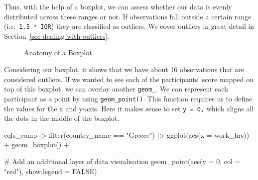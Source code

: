 \documentclass[
  letterpaper,
]{krantz}
\makeatletter
\newenvironment{Shaded}{\begin{snugshade}}{\end{snugshade}}
\newcommand{\AttributeTok}[1]{\textcolor[rgb]{0.40,0.45,0.13}{#1}}
\newcommand{\CommentTok}[1]{\textcolor[rgb]{0.37,0.37,0.37}{#1}}
\newcommand{\ConstantTok}[1]{\textcolor[rgb]{0.56,0.35,0.01}{#1}}
\newcommand{\DecValTok}[1]{\textcolor[rgb]{0.68,0.00,0.00}{#1}}
\newcommand{\FunctionTok}[1]{\textcolor[rgb]{0.28,0.35,0.67}{#1}}
\newcommand{\NormalTok}[1]{\textcolor[rgb]{0.00,0.23,0.31}{#1}}
\newcommand{\SpecialCharTok}[1]{\textcolor[rgb]{0.37,0.37,0.37}{#1}}
\newcommand{\StringTok}[1]{\textcolor[rgb]{0.13,0.47,0.30}{#1}}
\newenvironment{kframe}{%
\medskip{}
\setlength{\fboxsep}{.8em}
 \def\at@end@of@kframe{}%
 \ifinner\ifhmode%
  \def\at@end@of@kframe{\end{minipage}}%
  \begin{minipage}{\columnwidth}%
 \fi\fi%
 \def\FrameCommand##1{\hskip\@totalleftmargin \hskip-\fboxsep
 \colorbox{shadecolor}{##1}\hskip-\fboxsep
     \hskip-\linewidth \hskip-\@totalleftmargin \hskip\columnwidth}%
 \MakeFramed {\advance\hsize-\width
   \@totalleftmargin\z@ \linewidth\hsize
   \@setminipage}}%
 {\par\unskip\endMakeFramed%
 \at@end@of@kframe}
\renewenvironment{Shaded}{\begin{kframe}}{\end{kframe}}
\makeatother
\begin{document}
Thus, with the help of a boxplot, we can assess whether our data is
evenly distributed across these ranges or not. If observations fall
outside a certain range (i.e.~\texttt{1.5\ *\ IQR}) they are classified
as outliers. We cover outliers in great detail in
Section~\ref{sec-dealing-with-outliers}.

\begin{figure}


\caption{\label{fig-anatomy-of-a-boxplot}Anatomy of a Boxplot}

\end{figure}%

Considering our boxplot, it shows that we have about 16 observations
that are considered outliers. If we wanted to see each of the
participants' score mapped on top of this boxplot, we can overlay
another \texttt{geom\_}. We can represent each participant as a point by
using \texttt{geom\_point()}. This function requires us to define the
values for the x and y-axis. Here it makes sense to set
\texttt{y\ =\ 0,} which aligns all the dots in the middle of the
boxplot.

\begin{Shaded}
\begin{Highlighting}[]
\NormalTok{eqls\_comp }\SpecialCharTok{|\textgreater{}}
  \FunctionTok{filter}\NormalTok{(country\_name }\SpecialCharTok{==} \StringTok{"Greece"}\NormalTok{) }\SpecialCharTok{|\textgreater{}}
  \FunctionTok{ggplot}\NormalTok{(}\FunctionTok{aes}\NormalTok{(}\AttributeTok{x =}\NormalTok{  work\_hrs)) }\SpecialCharTok{+}
  \FunctionTok{geom\_boxplot}\NormalTok{() }\SpecialCharTok{+}
  
  \CommentTok{\# Add an additional layer of data visualisation}
  \FunctionTok{geom\_point}\NormalTok{(}\FunctionTok{aes}\NormalTok{(}\AttributeTok{y =} \DecValTok{0}\NormalTok{, }\AttributeTok{col =} \StringTok{"red"}\NormalTok{),}
             \AttributeTok{show.legend =} \ConstantTok{FALSE}\NormalTok{)}
\end{Highlighting}
\end{Shaded}
\end{document}
